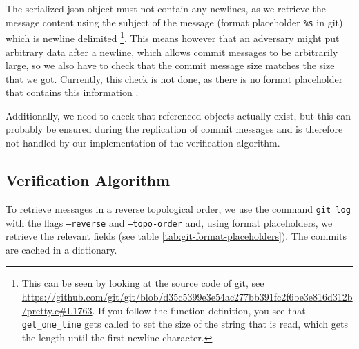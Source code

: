\documentclass{article}
\begin{document}
The serialized json object must not contain any newlines, as we retrieve the message content using the subject of the message (format placeholder \texttt{\%s} in git) which is newline delimited \footnote{This can be seen by looking at the source code of git, see \url{https://github.com/git/git/blob/d35c5399e3e54ac277bb391fc2f6be3e816d312b/pretty.c\#L1763}. If you follow the function definition, you see that \texttt{get\_one\_line} gets called to set the size of the string that is read, which gets the length until the first newline character.}. This means however that an adversary might put arbitrary data after a newline, which allows commit messages to be arbitrarily large, so we also have to check that the commit message size matches the size that we got. Currently, this check is not done, as there is no format placeholder that contains this information \cite{gitPrettyformatsDocumentation}.

Additionally, we need to check that referenced objects actually exist, but this can probably be ensured during the replication of commit messages and is therefore not handled by our implementation of the verification algorithm.

\subsection{Verification Algorithm}
\label{sec:impl-verification-alg}
To retrieve messages in a reverse topological order, we use the command \texttt{git log} with the flags \texttt{--reverse} and \texttt{--topo-order} and, using format placeholders, we retrieve the relevant fields (see table \ref{tab:git-format-placeholders}). The commits are cached in a dictionary.
\end{document}
